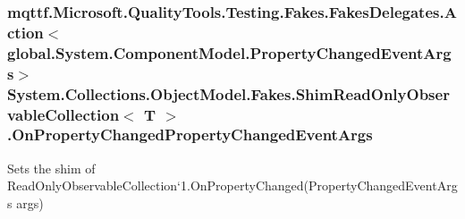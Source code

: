 \hypertarget{class_system_1_1_collections_1_1_object_model_1_1_fakes_1_1_shim_read_only_observable_collection_3_01_t_01_4_aa61b350450e6e092c8eebbfa3b37087e}{
\subsubsection[{On\-Property\-Changed\-Property\-Changed\-Event\-Args}]{\setlength{\rightskip}{0pt plus 5cm}mqttf.\-Microsoft.\-Quality\-Tools.\-Testing.\-Fakes.\-Fakes\-Delegates.\-Action$<$global.\-System.\-Component\-Model.\-Property\-Changed\-Event\-Args$>$ System.\-Collections.\-Object\-Model.\-Fakes.\-Shim\-Read\-Only\-Observable\-Collection$<$ T $>$.On\-Property\-Changed\-Property\-Changed\-Event\-Args\hspace{0.3cm}{\ttfamily [set]}}}\label{class_system_1_1_collections_1_1_object_model_1_1_fakes_1_1_shim_read_only_observable_collection_3_01_t_01_4_aa61b350450e6e092c8eebbfa3b37087e}


Sets the shim of Read\-Only\-Observable\-Collection`1.On\-Property\-Changed(\-Property\-Changed\-Event\-Args args)

